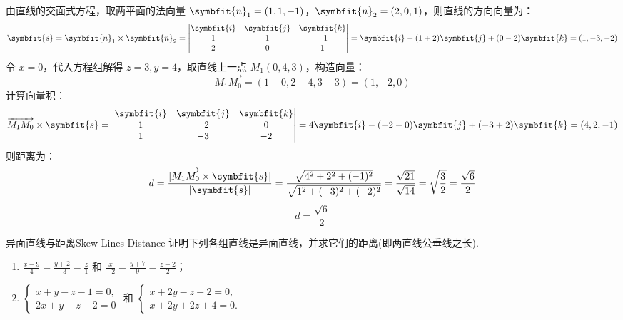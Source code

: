 \begin{solution}
    由直线的交面式方程，取两平面的法向量 $\symbfit{n}_1 = (1, 1, -1)$，$\symbfit{n}_2 = (2, 0, 1)$，则直线的方向向量为：
    \begin{equation*}
        \symbfit{s} = \symbfit{n}_1 \times \symbfit{n}_2 = \begin{vmatrix} \symbfit{i} & \symbfit{j} & \symbfit{k} \\ 1 & 1 & -1 \\ 2 & 0 & 1 \end{vmatrix} = \symbfit{i} - (1 + 2)\symbfit{j} + (0 - 2)\symbfit{k} = (1, -3, -2)
    \end{equation*}
    令 $x = 0$，代入方程组解得 $z = 3, y = 4$，取直线上一点 $M_1(0, 4, 3)$，构造向量：
    \begin{equation*}
        \overrightarrow{M_1M_0} = (1 - 0, 2 - 4, 3 - 3) = (1, -2, 0)
    \end{equation*}
    计算向量积：
    \begin{equation*}
        \overrightarrow{M_1M_0} \times \symbfit{s} = \begin{vmatrix} \symbfit{i} & \symbfit{j} & \symbfit{k} \\ 1 & -2 & 0 \\ 1 & -3 & -2 \end{vmatrix} = 4\symbfit{i} - (-2 - 0)\symbfit{j} + (-3 + 2)\symbfit{k} = (4, 2, -1)
    \end{equation*}
    则距离为：
    \begin{equation*}
        d = \frac{|\overrightarrow{M_1M_0} \times \symbfit{s}|}{|\symbfit{s}|} = \frac{\sqrt{4^2 + 2^2 + (-1)^2}}{\sqrt{1^2 + (-3)^2 + (-2)^2}} = \frac{\sqrt{21}}{\sqrt{14}} = \sqrt{\frac{3}{2}} = \frac{\sqrt{6}}{2}
    \end{equation*}
    \begin{equation*}
        \boxed{d = \frac{\sqrt{6}}{2}}
    \end{equation*}
\end{solution}


\begin{problem}{异面直线与距离}{Skew-Lines-Distance}
    证明下列各组直线是异面直线，并求它们的距离(即两直线公垂线之长).
    \begin{enumerate}
        \item $\frac{x - 9}{4} = \frac{y + 2}{-3} = \frac{z}{1}$ 和 $\frac{x}{-2} = \frac{y + 7}{9} = \frac{z - 2}{2}$；
        \item $\begin{cases} x + y - z - 1 = 0, \\ 2x + y - z - 2 = 0 \end{cases}$ 和 $\begin{cases} x + 2y - z - 2 = 0, \\ x + 2y + 2z + 4 = 0. \end{cases}$
    \end{enumerate}
\end{problem}

